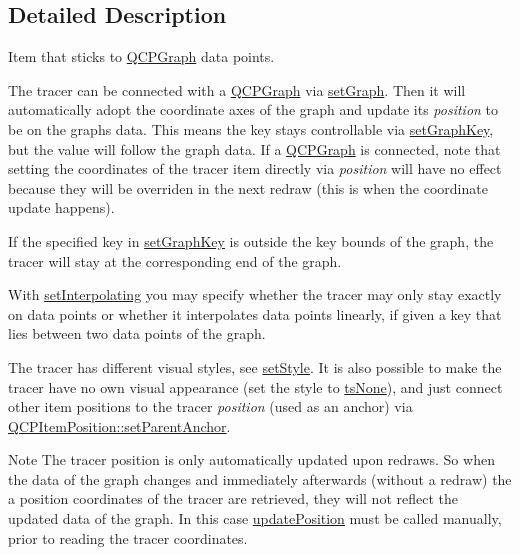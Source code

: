 \subsection{Detailed Description}
Item that sticks to \mbox{\hyperlink{class_q_c_p_graph}{Q\+C\+P\+Graph}} data points. 

 The tracer can be connected with a \mbox{\hyperlink{class_q_c_p_graph}{Q\+C\+P\+Graph}} via \mbox{\hyperlink{class_q_c_p_item_tracer_af5886f4ded8dd68cb4f3388f390790c0}{set\+Graph}}. Then it will automatically adopt the coordinate axes of the graph and update its {\itshape position} to be on the graph\textquotesingle{}s data. This means the key stays controllable via \mbox{\hyperlink{class_q_c_p_item_tracer_a6840143b42f3b685cedf7c6d83a704c8}{set\+Graph\+Key}}, but the value will follow the graph data. If a \mbox{\hyperlink{class_q_c_p_graph}{Q\+C\+P\+Graph}} is connected, note that setting the coordinates of the tracer item directly via {\itshape position} will have no effect because they will be overriden in the next redraw (this is when the coordinate update happens).

If the specified key in \mbox{\hyperlink{class_q_c_p_item_tracer_a6840143b42f3b685cedf7c6d83a704c8}{set\+Graph\+Key}} is outside the key bounds of the graph, the tracer will stay at the corresponding end of the graph.

With \mbox{\hyperlink{class_q_c_p_item_tracer_a6c244a9d1175bef12b50afafd4f5fcd2}{set\+Interpolating}} you may specify whether the tracer may only stay exactly on data points or whether it interpolates data points linearly, if given a key that lies between two data points of the graph.

The tracer has different visual styles, see \mbox{\hyperlink{class_q_c_p_item_tracer_a41a2ac4f1acd7897b4e2a2579c03204e}{set\+Style}}. It is also possible to make the tracer have no own visual appearance (set the style to \mbox{\hyperlink{class_q_c_p_item_tracer_a2f05ddb13978036f902ca3ab47076500aac27462c79146225bfa8fba24d2ee8a4}{ts\+None}}), and just connect other item positions to the tracer {\itshape position} (used as an anchor) via \mbox{\hyperlink{class_q_c_p_item_position_ac094d67a95d2dceafa0d50b9db3a7e51}{Q\+C\+P\+Item\+Position\+::set\+Parent\+Anchor}}.

\begin{DoxyNote}{Note}
The tracer position is only automatically updated upon redraws. So when the data of the graph changes and immediately afterwards (without a redraw) the a position coordinates of the tracer are retrieved, they will not reflect the updated data of the graph. In this case \mbox{\hyperlink{class_q_c_p_item_tracer_a5b90296109e36384aedbc8908a670413}{update\+Position}} must be called manually, prior to reading the tracer coordinates. 
\end{DoxyNote}


